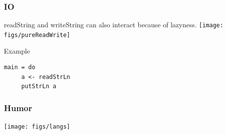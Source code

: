 \documentclass{beamer}
\begin{document}
\begin{frame}[fragile]
\frametitle{IO}
 readString and writeString can also interact because of lazyness.
 \vspace{0.5cm}
 \texttt{[image: figs/pureReadWrite]}
 \vspace{0.5cm}
 \begin{block}{Example}
  \begin{lstlisting}[basicstyle=\small]
   main = do
     a <- readStrLn
     putStrLn a
  \end{lstlisting}
 \end{block}
\end{frame}

\begin{frame}
\frametitle{Humor}
 \texttt{[image: figs/langs]}
\end{frame}

%
%
%
%
%
%


\end{document}
